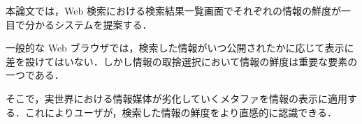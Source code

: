 


\begin{jabstract}

本論文では，Web 検索における検索結果一覧画面でそれぞれの情報の鮮度が一目で分かるシステムを提案する．

一般的な Web ブラウザでは，検索した情報がいつ公開されたかに応じて表示に差を設けてはいない．しかし情報の取捨選択において情報の鮮度は重要な要素の一つである．

そこで，実世界における情報媒体が劣化していくメタファを情報の表示に適用する．これによりユーザが，検索した情報の鮮度をより直感的に認識できる．

\end{jabstract}
